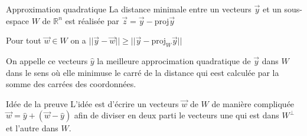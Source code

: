 \begin{parag}{Approximation quadratique}
    La distance minimale entre un vecteurs $\vec{y}$ et un sous-espace $W$ de $\mathbb{R}^n$ est réalisée par $\vec{z} = \vec{y} - \text{proj}\vec{y}$
    \begin{theoreme}
        Pour tout $\vec{w} \in W$ on a $||\vec{y} - \vec{w}|| \geq ||\vec{y} - \text{proj}_W\vec{y}||$
    \end{theoreme}
    On appelle ce vecteurs $\hat{y}$ la meilleure approcimation quadratique de $\vec{y}$ dans $W$ dans le sens où elle minimuse le carré de la distance qui eest calculée par la somme des carrées des coordonnées.
    \begin{subparag}{Idée de la preuve}
            L'idée est d'écrire un vecteurs $\vec{w}$ de $W$ de manière compliquée $\vec{w} = \hat{y} + (\vec{w} - \hat{y})$ afin de diviser en deux parti le vecteurs une qui est dans $W^\perp$ et l'autre dans $W$.
    \end{subparag}
\end{parag}

